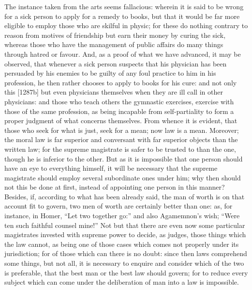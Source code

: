 The instance taken from the arts seems fallacious: wherein it is said to
be wrong for a sick person to apply for a remedy to books, but that it
would be far more eligible to employ those who are skilful in physic; for
these do nothing contrary to reason from motives of friendship but earn
their money by curing the sick, whereas those who have the management of
public affairs do many things through hatred or favour. And, as a proof of
what we have advanced, it may be observed, that whenever a sick person
suspects that his physician has been persuaded by his enemies to be guilty
of any foul practice to him in his profession, he then rather chooses to
apply to books for his cure: and not only this [1287b] but even physicians
themselves when they are ill call in other physicians: and those who teach
others the gymnastic exercises, exercise with those of the same
profession, as being incapable from self-partiality to form a proper
judgment of what concerns themselves. From whence it is evident, that
those who seek for what is just, seek for a mean; now law is a mean.
Moreover; the moral law is far superior and conversant with far superior
objects than the written law; for the supreme magistrate is safer to be
trusted to than the one, though he is inferior to the other. But as it is
impossible that one person should have an eye to everything himself, it
will be necessary that the supreme magistrate should employ several
subordinate ones under him; why then should not this be done at first,
instead of appointing one person in this manner? Besides, if, according to
what has been already said, the man of worth is on that account fit to
govern, two men of worth are certainly better than one: as, for instance,
in Homer, ``Let two together go:'' and also Agamemnon's wish; ``Were ten such
faithful counsel mine!'' Not but that there are even now some particular
magistrates invested with supreme power to decide, as judges, those things
which the law cannot, as being one of those cases which comes not properly
under its jurisdiction; for of those which can there is no doubt: since
then laws comprehend some things, but not all, it is necessary to enquire
and consider which of the two is preferable, that the best man or the best
law should govern; for to reduce every subject which can come under the
deliberation of man into a law is impossible.

